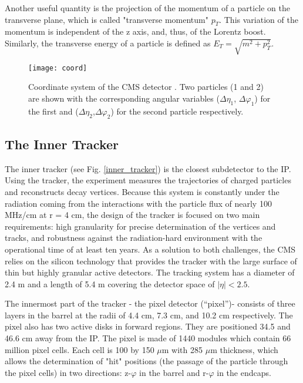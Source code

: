 \begin{normalsize}
Another useful quantity is the projection of the momentum of a particle on the transverse plane, which is called "transverse momentum" $p_T$. This variation of the momentum is independent of the z axis, and, thus, of the Lorentz boost.  Similarly, the transverse energy of a particle is defined as $E_T = \sqrt{m^2 + p_T^2 }$. 





\begin{figure}[H]
  \centering
  \texttt{[image: coord]}
  \caption[Coordinate system of the CMS detector]{Coordinate system of the CMS detector \cite{MonroyMontanez:2639240}. Two particles (1 and 2) are shown with the corresponding angular variables ($\Delta \eta_1$, $\Delta \varphi_1$) for the first and ($\Delta \eta_2$,$ \Delta \varphi_2$) for the second particle respectively.}
  \label{coord}
\end{figure}


\subsection{The Inner Tracker}

The inner tracker \cite{Tracker_phase2} (see Fig. \ref{inner_tracker}) is the closest subdetector to the IP. Using the tracker, the experiment measures the trajectories of charged particles and reconstructs decay vertices. Because this system is constantly under the radiation coming from the interactions with the particle flux of nearly 100 MHz/cm at r = 4 cm, the design of the tracker is focused on two main requirements: high granularity for precise determination of the vertices and tracks, and robustness against the radiation-hard environment with the operational time of at least ten years. As a solution to both challenges, the CMS relies on the silicon technology that provides the tracker with the large surface of thin but highly granular active detectors. The tracking system has a diameter of 2.4 m and a length of 5.4 m covering the detector space of $|\eta|< 2.5$. 

The innermost part of the tracker - the pixel detector (``pixel'')- consists of three layers in the barrel at the radii of 4.4 cm, 7.3 cm, and 10.2 cm respectively. The pixel also has two active disks in forward regions. They are positioned 34.5 and 46.6 cm away from the IP. The pixel is made of 1440 modules which contain 66 million pixel cells. Each cell is 100 by 150 $\mu$m with 285 $\mu$m thickness, which allows the determination of "hit" positions (the passage of the particle through the pixel cells) in two directions: z-$\varphi$ in the barrel and r-$\varphi$ in the endcaps.


\end{normalsize}

